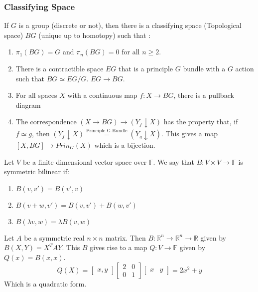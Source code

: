 \documentclass[crop=false,class=article,oneside]{standalone}
\begin{document}
            \subsubsection{Classifying Space}
            If $G$ is a group (discrete or not), then there is a classifying space (Topological space) $BG$ (unique up to homotopy) such that :
            \begin{enumerate}
                \item $\pi_{1}(BG)=G$ and $\pi_{n}(BG)=0$ for all $n\geq 2$.
                \item There is a contractible space $EG$ that is a principle $G$ bundle with a $G$ action such that $BG\simeq EG/G$. $EG\rightarrow BG$.
                \item For all spaces $X$ with a continuous map $f:X\rightarrow BG$, there is a pullback diagram
                \item The correspondence $(X\rightarrow BG)\rightarrow (Y_{f}\downarrow X)$ has the property that, if $f\simeq g$, then $(Y_{f}\downarrow X)\overset{\textrm{Principle G-Bundle}}{=}(Y_{g}\downarrow X)$. This gives a map $[X,BG]\rightarrow Prin_{G}(X)$ which is a bijection.
            \end{enumerate}
            \begin{definition}
            Let $V$ be a finite dimensional vector space over $\mathbb{F}$. We say that $B:V\times V\rightarrow\mathbb{F}$ is symmetric bilinear if:
            \begin{enumerate}
                \item $B(v,v')=B(v',v)$
                \item $B(v+w,v')=B(v,v')+B(w,v')$
                \item $B(\lambda v,w)=\lambda B(v,w)$
            \end{enumerate}
            \end{definition}
            \begin{example}
            Let $A$ be a symmetric real $n\times n$ matrix. Then $B:\mathbb{R}^{n}\rightarrow\mathbb{R}^{n}\rightarrow \mathbb{R}$ given by $B(X,Y) = X^{T}AY$. This $B$ gives rise to a map $Q:V\rightarrow \mathbb{F}$ given by $Q(x)=B(x,x)$.
            \begin{equation*}
                Q(X)=\begin{bmatrix}x,y\end{bmatrix}\begin{bmatrix}2&0\\0&1\end{bmatrix}\begin{bmatrix}x&y\end{bmatrix}=2x^{2}+y
            \end{equation*}
            Which is a quadratic form.
            \end{example}
\end{document}
